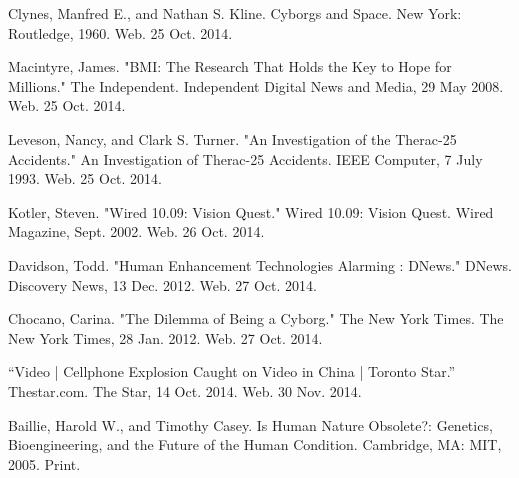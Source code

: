 \documentclass[12pt,a4paper,notitlepage]{article}
\begin{document}
\begin{thebibliography}{9}

Clynes, Manfred E., and Nathan S. Kline. Cyborgs and Space. New York: Routledge, 1960. Web. 25 Oct. 2014.

Macintyre, James. "BMI: The Research That Holds the Key to Hope for Millions." The Independent. Independent Digital News and Media, 29 May 2008. Web. 25 Oct. 2014.

Leveson, Nancy, and Clark S. Turner. "An Investigation of the Therac-25 Accidents." An Investigation of Therac-25 Accidents. IEEE Computer, 7 July 1993. Web. 25 Oct. 2014.

Kotler, Steven. "Wired 10.09: Vision Quest." Wired 10.09: Vision Quest. Wired Magazine, Sept. 2002. Web. 26 Oct. 2014.

Davidson, Todd. "Human Enhancement Technologies Alarming : DNews." DNews. Discovery News, 13 Dec. 2012. Web. 27 Oct. 2014.

Chocano, Carina. "The Dilemma of Being a Cyborg." The New York Times. The New York Times, 28 Jan. 2012. Web. 27 Oct. 2014.

``Video | Cellphone Explosion Caught on Video in China | Toronto Star.''
Thestar.com. The Star, 14 Oct. 2014. Web. 30 Nov. 2014.

Baillie, Harold W., and Timothy Casey. Is Human Nature Obsolete?: Genetics,
Bioengineering, and the Future of the Human Condition. Cambridge, MA: MIT, 2005.
Print.
\end{thebibliography}
\end{document}
